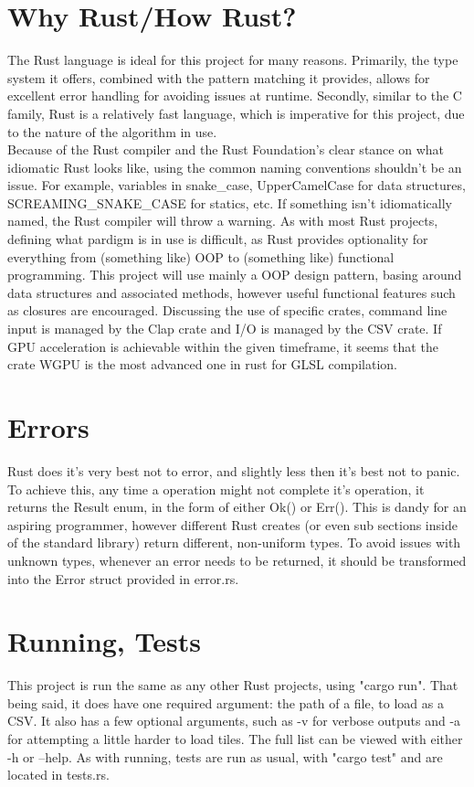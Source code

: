 \documentclass[11pt]{article}
\begin{document}
\section{Why Rust/How Rust?}
The Rust language is ideal for this project for many reasons. Primarily, the type system it offers, combined with the
pattern matching it provides, allows for excellent error handling for avoiding issues at runtime. Secondly, similar to the C family,
Rust is a relatively fast language, which is imperative for this project, due to the nature of the algorithm in use. \\
Because of the Rust compiler and the Rust Foundation's clear stance on what idiomatic Rust looks like, using the common naming conventions shouldn't be an issue.
For example, variables in snake\_case, UpperCamelCase for data structures, SCREAMING\_SNAKE\_CASE for statics, etc. If something isn't idiomatically named, the 
Rust compiler will throw a warning. As with most Rust projects, defining what pardigm is in use is difficult, as Rust provides optionality for everything 
from (something like) OOP to (something like) functional programming. This project will use mainly a OOP design pattern, basing around data 
structures and associated methods, however useful functional features such as closures are encouraged.
Discussing the use of specific crates, command line input is managed by the Clap crate and I/O is managed by the CSV crate. 
If GPU acceleration is achievable within the given timeframe, it seems that the crate WGPU is the most advanced one in rust for GLSL compilation. 
\section{Errors}
Rust does it's very best not to error, and slightly less then it's best not to panic. To achieve this, any time a operation might not complete it's 
operation, it returns the Result enum, in the form of either Ok() or Err(). This is dandy for an aspiring programmer, however different Rust creates (or even sub sections inside
of the standard library) return different, non-uniform types. To avoid issues with unknown types, whenever an error needs to be returned, it should be transformed into the Error struct
provided in error.rs. 
\section{Running, Tests}
This project is run the same as any other Rust projects, using "cargo run". That being said, it does have one required argument: the path of a file, to load as a CSV.
It also has a few optional arguments, such as -v for verbose outputs and -a for attempting a little harder to load tiles. The full list can be viewed with either -h or --help.
As with running, tests are run as usual, with "cargo test" and are located in tests.rs.
\end{document}
